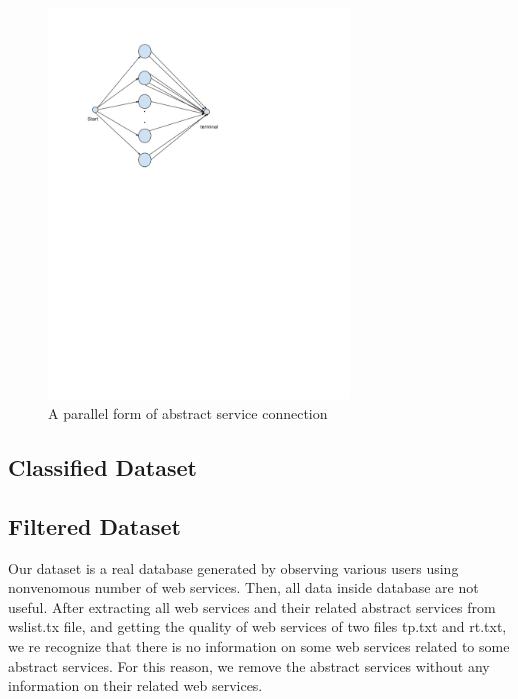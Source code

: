 \documentclass[10pt,journal,compsoc]{IEEEtran}
\begin{document}
\begin{figure}[t]
\label{fig:par-mdp}
\includegraphics[width=8cm]{graphs/par-mdp}
\caption{A parallel form of abstract service connection}
\centering
\end{figure}

\subsection{Classified Dataset}

\subsection{Filtered Dataset}

Our dataset is a real database generated by observing various users using nonvenomous number of web services. Then, all data inside database are not useful. After extracting all web services and their related abstract services from wslist.tx file, and getting the quality of web services of two files tp.txt and rt.txt, we re recognize that there is no information on some web services related to some abstract services. For this reason, we remove the abstract services without any information on their related web services. 
\end{document}
